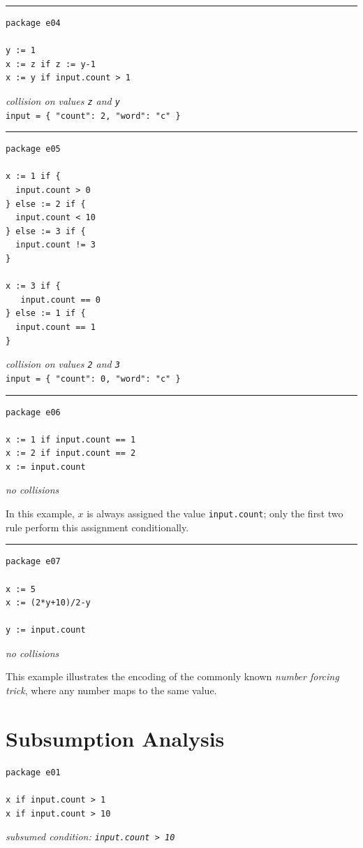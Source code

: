 \noindent\rule{\linewidth}{0.4pt}
\begin{lstlisting}
package e04

y := 1
x := z if z := y-1
x := y if input.count > 1
\end{lstlisting}
\textit{collision on values \texttt{z} and \texttt{y}} \\
\texttt{input = \{ "count": 2, "word": "c" \}}

\noindent\rule{\linewidth}{0.4pt}
\begin{lstlisting}
package e05

x := 1 if {
  input.count > 0
} else := 2 if {
  input.count < 10
} else := 3 if {
  input.count != 3
}

x := 3 if {
   input.count == 0
} else := 1 if {
  input.count == 1
}
\end{lstlisting}
\textit{collision on values \texttt{2} and \texttt{3}} \\
\texttt{input = \{ "count": 0, "word": "c" \}}

\noindent\rule{\linewidth}{0.4pt}
\begin{lstlisting}
package e06

x := 1 if input.count == 1
x := 2 if input.count == 2
x := input.count
\end{lstlisting}
\textit{no collisions}

In this example, $x$ is always assigned the value \texttt{input.count}; only the first two rule perform this assignment conditionally.

\noindent\rule{\linewidth}{0.4pt}
\begin{lstlisting}
package e07

x := 5
x := (2*y+10)/2-y

y := input.count
\end{lstlisting}
\textit{no collisions}

This example illustrates the encoding of the commonly known \emph{number forcing trick}, where any number maps to the same value.

\section{Subsumption Analysis}

\begin{lstlisting}
package e01

x if input.count > 1
x if input.count > 10
\end{lstlisting}
\textit{subsumed condition: \texttt{input.count > 10}}

